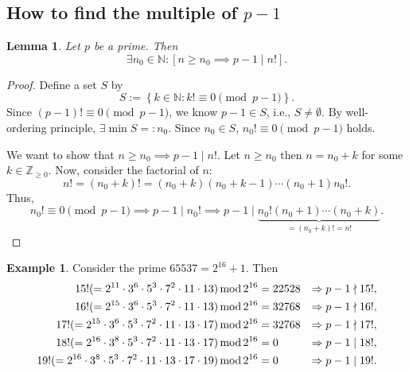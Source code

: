 \documentclass[12pt,openany]{book}
\newtheorem{lemma}[theorem]{Lemma}
\theoremstyle{definition}
\newtheorem{example}{Example}[chapter]
\newcommand{\set}[1]{\left\{#1\right\}}
\newcommand{\N}{\mathbb{N}}
\newcommand{\Z}{\mathbb{Z}}
\newcommand{\ie}{\textnormal{i.e.}}
\newcommand{\of}[1]{\left( #1 \right)}
\renewcommand{\mod}{\operatorname{\textnormal{mod}}}
\begin{document}
	\subsection{How to find the multiple of $p-1$}
	
	\begin{tcolorbox}[colback=white,colframe=lemcolor,arc=5pt,title={\color{white}\bf Existence of the Multiple of $p-1$}]
		\begin{lemma}
			Let $p$ be a prime. Then \[
			\exists n_0\in\N:\left[n\geq n_0\implies p-1\mid n!\right].
			\]
		\end{lemma}
	\end{tcolorbox}
	\begin{proof}
		Define a set $S$ by \[
		S:=\set{k\in\N:k!\equiv0\pmod{p-1}}.
		\] Since $\of{p-1}!\equiv 0\pmod{p-1}$, we know $p-1\in S$, \ie, $S\neq\emptyset$. By well-ordering principle, $\exists\min S=:n_0$. Since $n_0\in S$, $n_0!\equiv 0\pmod{p-1}$ holds.
		
		We want to show that $n\geq n_0\implies p-1\mid n!$. Let $n\geq n_0$ then $n=n_0+k$ for some $k\in\Z_{\geq 0}$. Now, consider the factorial of $n$: \[
		n!=\of{n_0+k}!=\of{n_0+k}\of{n_0+k-1}\cdots\of{n_0+1}n_0!.
		\] Thus, \[
		n_0!\equiv 0\pmod{p-1}\implies p-1\mid n_0!\implies p-1\mid \underbrace{n_0!\of{n_0+1}\cdots\of{n_0+k}}_{=\of{n_0+k}!=n!}.
		\]
	\end{proof}

	\begin{example}
		Consider the prime $65537=2^{16}+1$. Then \begin{align*}
			15!(=2^{11}\cdot 3^6\cdot 5^3\cdot 7^2\cdot 11\cdot 13)\mod 2^{16} &= 22528&\Rightarrow p-1\nmid 15!,\\
			16!(=2^{15}\cdot 3^6\cdot 5^3\cdot 7^2\cdot 11\cdot 13)\mod 2^{16} &= 32768&\Rightarrow p-1\nmid 16!,\\
			17!(=2^{15}\cdot 3^6\cdot 5^3\cdot 7^2\cdot 11\cdot 13\cdot 17)\mod 2^{16} &= 32768&\Rightarrow p-1\nmid 17!,\\
			18!(=2^{16}\cdot 3^8\cdot 5^3\cdot 7^2\cdot 11\cdot 13\cdot 17)\mod 2^{16} &= 0&\Rightarrow p-1\mid 18!,\\
			19!(=2^{16}\cdot 3^8\cdot 5^3\cdot 7^2\cdot 11\cdot 13\cdot 17\cdot 19)\mod 2^{16} &= 0&\Rightarrow p-1\mid 19!.
		\end{align*}
	\end{example}
	
\end{document}
